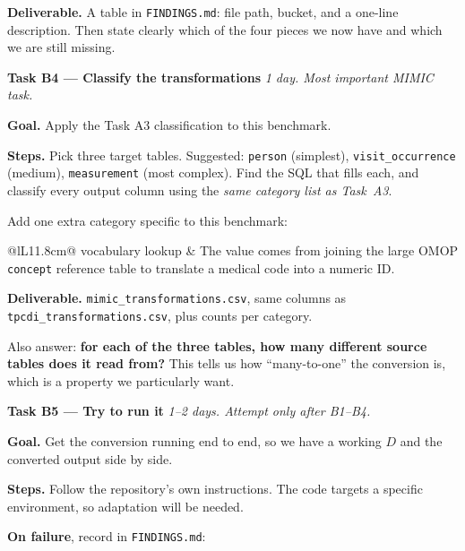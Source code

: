 \documentclass[11pt,a4paper]{article}
\newcommand{\code}[1]{\texttt{\small #1}}
\begin{document}
\textbf{Deliverable.} A table in \code{FINDINGS.md}: file path, bucket, and a one-line
description. Then state clearly which of the four pieces we now have and which we are
still missing.

\vspace{4pt}
\begin{taskbox}
\textbf{Task B4 --- Classify the transformations} \hfill \emph{1 day. Most important MIMIC task.}
\end{taskbox}

\textbf{Goal.} Apply the Task A3 classification to this benchmark.

\textbf{Steps.} Pick three target tables. Suggested: \code{person} (simplest),
\code{visit\_occurrence} (medium), \code{measurement} (most complex). Find the SQL that
fills each, and classify every output column using the \emph{same category list as
Task~A3}.

Add one extra category specific to this benchmark:

\begin{center}\small
\begin{tabular}{@{}lL{11.8cm}@{}}
\toprule
vocabulary lookup & The value comes from joining the large OMOP \code{concept} reference
table to translate a medical code into a numeric ID. \\
\bottomrule
\end{tabular}
\end{center}

\textbf{Deliverable.} \code{mimic\_transformations.csv}, same columns as
\code{tpcdi\_transformations.csv}, plus counts per category.

Also answer: \textbf{for each of the three tables, how many different source tables does it
read from?} This tells us how ``many-to-one'' the conversion is, which is a property we
particularly want.

\vspace{4pt}
\begin{taskbox}
\textbf{Task B5 --- Try to run it} \hfill \emph{1--2 days. Attempt only after B1--B4.}
\end{taskbox}

\textbf{Goal.} Get the conversion running end to end, so we have a working $D$ and the
converted output side by side.

\textbf{Steps.} Follow the repository's own instructions. The code targets a specific
environment, so adaptation will be needed.

\textbf{On failure}, record in \code{FINDINGS.md}:
\end{document}
